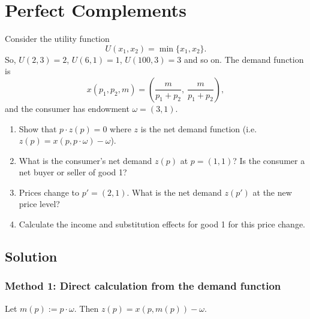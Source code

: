 \documentclass[12pt]{article}
\newcommand{\dotp}{\cdot}
\begin{document}
\section{Perfect Complements}
Consider the utility function
\[
U(x_1,x_2)=\min\{x_1,x_2\}.
\]
So, \(U(2,3)=2\), \(U(6,1)=1\), \(U(100,3)=3\) and so on. The demand function is
\[
x(p_1,p_2,m)=\left(\frac{m}{p_1+p_2},\ \frac{m}{p_1+p_2}\right),
\]
and the consumer has endowment \(\omega=(3,1)\).
\begin{enumerate}[label=\arabic*., leftmargin=*]
  \item Show that \(p\dotp z(p)=0\) where \(z\) is the net demand function (i.e.\ \(z(p)=x(p,p\dotp \omega)-\omega\)).
  \item What is the consumer's net demand \(z(p)\) at \(p=(1,1)\)? Is the consumer a net buyer or seller of good 1?
  \item Prices change to \(p'=(2,1)\). What is the net demand \(z(p')\) at the new price level?
  \item Calculate the income and substitution effects for good 1 for this price change.
\end{enumerate}

\subsection*{Solution}

\subsubsection*{Method 1: Direct calculation from the demand function}
Let \(m(p):=p\dotp\omega\). Then \(z(p)=x(p,m(p))-\omega\).
\end{document}

